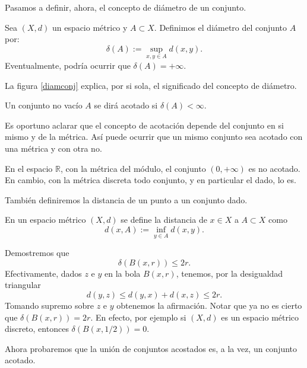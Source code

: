 Pasamos a definir, ahora, el concepto de diámetro de un
conjunto.

\begin{definicion}{} Sea $(X,d)$ un espacio métrico y $A\subset
X$. Definimos el diámetro del conjunto $A$ por:
\[
	\delta(A):=\sup\limits_{x,y\in A}d(x,y).
\]
Eventualmente, podría ocurrir que $\delta(A)=+\infty$.
\end{definicion}
La figura \vref{diamconj} explica, por si sola, el significado del
concepto de diámetro.




\begin{definicion}{} Un conjunto no vacío $A$ se dirá acotado si
$\delta(A)<\infty$.
\end{definicion}
Es oportuno aclarar que el concepto de acotación depende del
conjunto en si mismo y de la métrica. Así puede ocurrir que
un mismo conjunto sea acotado con una métrica y con otra no.

\begin{ejemplo}{} En el espacio $\mathbb{R}$, con la métrica del
módulo, el conjunto $(0,+\infty)$ es no acotado. En cambio, con
la métrica discreta todo conjunto, y en particular el dado, lo
es.
\end{ejemplo}

También definiremos la distancia de un punto a un conjunto dado.

\begin{definicion}{} En un espacio métrico $(X,d)$ se define la
distancia de $x\in X$ a $A\subset X$ como
\[d(x,A):=\inf\limits_{y\in A}d(x,y).\]
\end{definicion}

Demostremos que
\[\delta(B(x,r))\leq 2r.\]
Efectivamente, dados $z$ e $y$ en la bola $B(x,r)$, tenemos, por
la desigualdad triangular
\[d(y,z)\leq d(y,x)+d(x,z)\leq 2r.\]
Tomando supremo sobre $z$ e $y$ obtenemos la afirmación. Notar
que ya no es cierto que $\delta(B(x,r))=2r$. En efecto, por
ejemplo si $(X,d)$ es un espacio métrico discreto, entonces
$\delta(B(x,1/2))=0$.

Ahora probaremos que la unión de conjuntos acostados es, a la
vez, un conjunto acotado.

